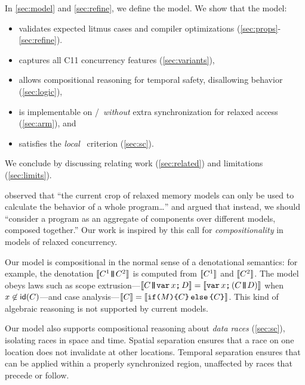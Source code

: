 In \textsection\ref{sec:model} and \textsection\ref{sec:refine}, we define the model.  We show that the model:
\begin{itemize}
\item validates expected litmus cases and compiler optimizations
  (\textsection\ref{sec:props}-\ref{sec:refine}).

\item captures all C11 concurrency features  %
  (\textsection\ref{sec:variants}),

\item allows compositional reasoning for temporal safety, disallowing \oota{} behavior %
  (\textsection\ref{sec:logic}),

\item is implementable on \armeight/\tso\ {\em without} extra synchronization for
  relaxed access (\textsection\ref{sec:arm}), and

\item  satisfies the \emph{local} \drfsc\ criterion \cite{Dolan:2018:BDR:3192366.3192421} (\textsection\ref{sec:sc}).

\end{itemize}
We conclude by discussing relating work (\textsection\ref{sec:related}) and limitations (\textsection\ref{sec:limits}).


\citet{Batty17} observed that ``the current crop of relaxed memory models can
only be used to calculate the behavior of a whole program\ldots'' and argued
that instead, we should ``consider a program as an aggregate of components
over different models, composed together.''  Our work is inspired by this
call for \emph{compositionality} in models of relaxed concurrency.

Our model is compositional in the normal sense of a denotational semantics:
for example, the denotation $\sem{C^1\!{\PAR}\! C^2}$ is computed from
$\llbracket C^1\rrbracket$ and $\llbracket C^2\rrbracket$.  The model obeys laws such as scope
extrusion---$\sem{\aCmd\!{\PAR}\! \VAR\aLoc\SEMI\bCmd} =
\sem{\VAR\aLoc\SEMI(\aCmd\!{\PAR}\!\bCmd)}$ when $x\not\in\mathsf{id}(C)$---and
case analysis---$\llbracket C\rrbracket = \llbracket\texttt{if}\allowbreak\texttt{(}M\texttt{)}\allowbreak\texttt{\{}C\texttt{\}}\,\allowbreak\texttt{else}\allowbreak\,\texttt{\{}C\texttt{\}}\rrbracket$.
This kind of algebraic reasoning is not supported by current models.

Our model also supports compositional reasoning about \emph{data races}
(\textsection\ref{sec:sc}), isolating races in space and time.  Spatial
separation ensures that a race on one location does not invalidate \drfsc{}
at other locations.  Temporal separation ensures that \drfsc{} can be applied
within a properly synchronized region, unaffected by races that precede or
follow.

